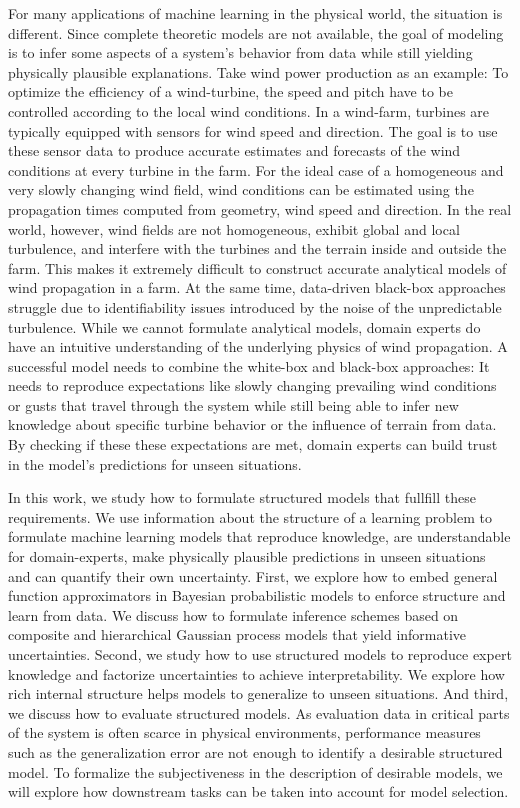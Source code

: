 For many applications of machine learning in the physical world, the situation is different.
Since complete theoretic models are not available, the goal of modeling is to infer some aspects of a system's behavior from data while still yielding physically plausible explanations.
Take wind power production as an example:
To optimize the efficiency of a wind-turbine, the speed and pitch have to be controlled according to the local wind conditions.
In a wind-farm, turbines are typically equipped with sensors for wind speed and direction.
The goal is to use these sensor data to produce accurate estimates and forecasts of the wind conditions at every turbine in the farm.
For the ideal case of a homogeneous and very slowly changing wind field, wind conditions can be estimated using the propagation times computed from geometry, wind speed and direction.
In the real world, however, wind fields are not homogeneous, exhibit global and local turbulence, and interfere with the turbines and the terrain inside and outside the farm.
This makes it extremely difficult to construct accurate analytical models of wind propagation in a farm.
At the same time, data-driven black-box approaches struggle due to identifiability issues introduced by the noise of the unpredictable turbulence.
While we cannot formulate analytical models, domain experts do have an intuitive understanding of the underlying physics of wind propagation.
A successful model needs to combine the white-box and black-box approaches:
It needs to reproduce expectations like slowly changing prevailing wind conditions or gusts that travel through the system while still being able to infer new knowledge about specific turbine behavior or the influence of terrain from data.
By checking if these these expectations are met, domain experts can build trust in the model's predictions for unseen situations.

In this work, we study how to formulate structured models that fullfill these requirements.
We use information about the structure of a learning problem to formulate machine learning models that reproduce knowledge, are understandable for domain-experts, make physically plausible predictions in unseen situations and can quantify their own uncertainty.
First, we explore how to embed general function approximators in Bayesian probabilistic models to enforce structure and learn from data.
We discuss how to formulate inference schemes based on composite and hierarchical Gaussian process models that yield informative uncertainties.
Second, we study how to use structured models to reproduce expert knowledge and factorize uncertainties to achieve interpretability.
We explore how rich internal structure helps models to generalize to unseen situations.
And third, we discuss how to evaluate structured models.
As evaluation data in critical parts of the system is often scarce in physical environments, performance measures such as the generalization error are not enough to identify a desirable structured model.
To formalize the subjectiveness in the description of desirable models, we will explore how downstream tasks can be taken into account for model selection.


